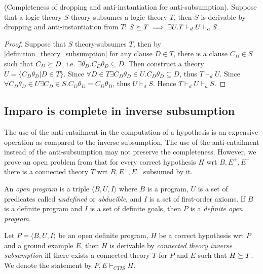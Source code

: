 \begin{proposition}(Completeness of dropping and anti-instantiation for anti-subsumption).
Suppose that a logic theory $S$ theory-subsumes a logic theory $T$, then $S$ is derivable by dropping and anti-instantiation from $T$:
$S \succeq T \implies \exists U. T \vdash_d U \vdash_a S$.
\end{proposition}
\begin{proof}
Suppose that $S$ theory-subsumes $T$, then by \ref{definition_theory_subsumption} for any clause $D \in T$, there is a clause $C_D \in S$ such
that $C_D \succeq D$, i.e. $\exists \theta_{D}. C_D \theta_D \subseteq D$.
Then construct a theory $U=\{C_D \theta_D | D \in T \}$.
Since $\forall D \in T \exists C_D \theta_D \in U. C_D \theta_D \subseteq D$, thus $T \vdash_d U$.
Since $\forall C_D \theta_D \in U \exists C_D \in S. C_D \theta_D=C_D \theta_D$, thus $U \vdash_d S$. Hence $T \vdash_d U \vdash_a S$.
\end{proof}

\subsection{Imparo is complete in inverse subsumption}
The use of the anti-entailment\cite{yamamoto2012inverse} in the computation of a hypothesis is an expensive operation as compared to the inverse subsumption. The use of the anti-entailment instead of the anti-subsumption may not preserve the completeness. However, we prove an open problem from \cite{yamamoto2012inverse} that for every correct hypothesis $H$ wrt $B, E^{+}, E^{-}$ there is a connected theory $T$ wrt $B, E^{+}, E^{-}$ subsumed by it.

\begin{defn}\cite{kimber2012learning}
An \emph{open program} is a triple $\langle B, U, I \rangle$ where $B$ is a program, $U$ is a set of predicates called \emph{undefined} or \emph{abducible}, and $I$ is a set of first-order
axioms. If $B$ is a definite program and $I$ is a set of definite goals, then $P$ is a 
\emph{definite open program}.
\end{defn}

\begin{defn}
Let $P=\langle B, U, I \rangle$ be an open definite program, $H$ be a correct hypothesis wrt $P$ and a ground example $E$, then $H$ is derivable by
\emph{connected theory inverse subsumption}
iff there exists a connected theory $T$ for $P$ and $E$ such that $H \succeq T$.
We denote the statement by $P, E \vdash_{CTIS} H$.
\end{defn}

